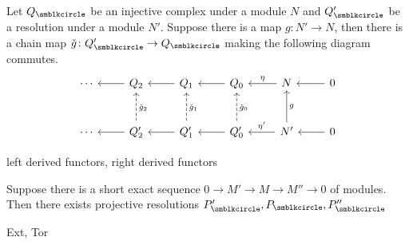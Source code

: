 \begin{lemma}
  Let $Q_\CCCIR$ be an injective complex under a module $N$ and $Q_\CCCIR'$ be a resolution under a module $N'$. Suppose there is a map $g\colon N'\to N$, then there is a chain map $\check g\colon Q_\CCCIR'\to Q_\CCCIR$ making the following diagram commutes.
  \begin{equation*}
    \begin{tikzcd}[row sep=large]
      \dotsb & Q_2 & Q_1 & Q_0 & N & 0\\
      \dotsb & Q_2' & Q_1' & Q_0' & N' & 0
      \arrow[from=1-1,leftarrow]{1-2}[]{}
      \arrow[from=1-2,leftarrow]{1-3}[]{}
      \arrow[from=1-3,leftarrow]{1-4}[]{}
      \arrow[from=1-4,leftarrow]{1-5}[]{\eta}
      \arrow[from=1-5,leftarrow]{1-6}[]{}
      \arrow[from=2-1,leftarrow]{2-2}[]{}
      \arrow[from=2-2,leftarrow]{2-3}[]{}
      \arrow[from=2-3,leftarrow]{2-4}[]{}
      \arrow[from=2-4,leftarrow]{2-5}[]{\eta'}
      \arrow[from=2-5,leftarrow]{2-6}[]{}
      \arrow[from=1-2,dashed,leftarrow]{2-2}[]{\check{g}_2}
      \arrow[from=1-3,dashed,leftarrow]{2-3}[]{\check{g}_1}
      \arrow[from=1-4,dashed,leftarrow]{2-4}[]{\check{g}_0}
      \arrow[from=1-5,leftarrow]{2-5}[]{g}
    \end{tikzcd}
  \end{equation*}
\end{lemma}

left derived functors, right derived functors

\begin{lemma}
  Suppose there is a short exact sequence $0\to M'\to M\to M''\to 0$ of modules. Then there exists projective resolutions $P_\CCCIR', P_\CCCIR, P_\CCCIR''$
\end{lemma}

Ext, Tor
